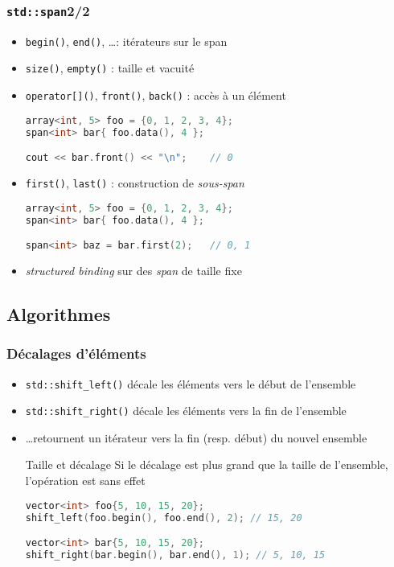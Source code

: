\documentclass[C++.tex]{subfiles}
\begin{document}
\begin{frame}[fragile]
	\frametitle{\lstinline|std::span|\titlehfill{}2/2}
	\begin{itemize}
		\item \lstinline|begin()|, \lstinline|end()|, \ldots : itérateurs sur le span
		\item \lstinline|size()|, \lstinline|empty()| : taille et vacuité
		\item \lstinline|operator[]()|, \lstinline|front()|, \lstinline|back()| : accès à un élément

		\begin{lstlisting}[language=C++]
array<int, 5> foo = {0, 1, 2, 3, 4};
span<int> bar{ foo.data(), 4 };

cout << bar.front() << "\n";    // 0\end{lstlisting}

		\item \lstinline|first()|, \lstinline|last()| : construction de \textit{sous-span}

		\begin{lstlisting}[language=C++]
array<int, 5> foo = {0, 1, 2, 3, 4};
span<int> bar{ foo.data(), 4 };

span<int> baz = bar.first(2);   // 0, 1\end{lstlisting}

		\item \textit{structured binding} sur des \textit{span} de taille fixe
	\end{itemize}
\end{frame}

\subsection*{Algorithmes}
\begin{frame}[fragile]
	\frametitle{Décalages d'éléments}
	\begin{itemize}
		\item \lstinline|std::shift_left()| décale les éléments vers le début de l'ensemble
		\item \lstinline|std::shift_right()| décale les éléments vers la fin de l'ensemble
		\item \ldots retournent un itérateur vers la fin (resp. début) du nouvel ensemble

		\begin{block}{Taille et décalage}
			Si le décalage est plus grand que la taille de l'ensemble, l'opération est sans effet
		\end{block}

		\begin{lstlisting}[language=C++]
vector<int> foo{5, 10, 15, 20};
shift_left(foo.begin(), foo.end(), 2); // 15, 20

vector<int> bar{5, 10, 15, 20};
shift_right(bar.begin(), bar.end(), 1); // 5, 10, 15\end{lstlisting}
	\end{itemize}
\end{frame}
\end{document}
